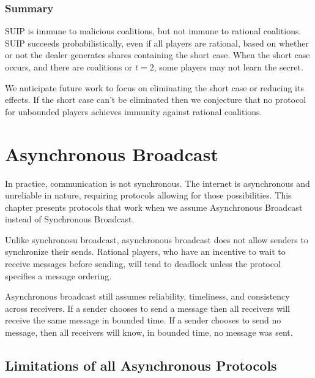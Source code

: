 \documentclass{dalcsthesis}
\begin{document}
\subsection{Summary}

SUIP is immune to malicious coalitions, but not immune to rational coalitions. SUIP succeeds probabilistically, even if all players are rational, based on whether or not the dealer generates shares containing the short case. When the short case occurs, and there are coalitions or $t=2$, some players may not learn the secret.

We anticipate future work to focus on eliminating the short case or reducing its effects. If the short case can't be eliminated then we conjecture that no protocol for unbounded players achieves immunity against rational coalitions.





\chapter{Asynchronous Broadcast}

In practice, communication is not synchronous. The internet is asynchronous and unreliable in nature, requiring protocols allowing for those possibilities. This chapter presents protocols that work when we assume Asynchronous Broadcast instead of Synchronous Broadcast.

Unlike synchronosu broadcast, asynchronous broadcast does not allow senders to synchronize their sends. Rational players, who have an incentive to wait to receive messages before sending, will tend to deadlock unless the protocol specifies a message ordering.

Asynchronous broadcast still assumes reliability, timeliness, and consistency across receivers. If a sender chooses to send a message then all receivers will receive the same message in bounded time. If a sender chooses to send no message, then all receivers will know, in bounded time, no message was sent.

\section{Limitations of all Asynchronous Protocols}
\end{document}
